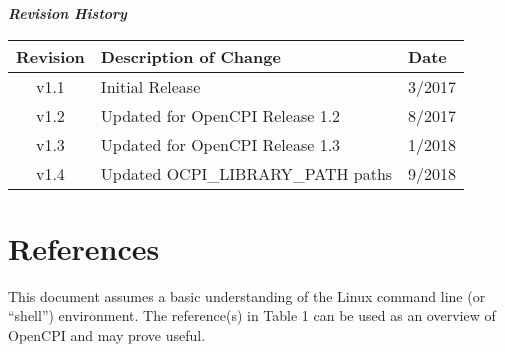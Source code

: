 	\begin{center}
	\textit{\textbf{Revision History}}
		\begin{table}[H]
		\label{table:revisions} %
			\begin{tabularx}{\textwidth}{|c|X|l|}
			\hline
			\rowcolor{blue}
			\textbf{Revision} & \textbf{Description of Change} & \textbf{Date} \\
		    \hline
		    v1.1 & Initial Release & 3/2017 \\
		    \hline
		    v1.2 & Updated for OpenCPI Release 1.2 & 8/2017 \\
			\hline
			v1.3 & Updated for OpenCPI Release 1.3 & 1/2018 \\
			\hline
			v1.4 & Updated OCPI\_LIBRARY\_PATH paths & 9/2018 \\
			\hline
			\end{tabularx}
		\end{table}
	\end{center}

\newpage

\tableofcontents

\newpage

\section{References}

	This document assumes a basic understanding of the Linux command line (or ``shell'') environment.  The reference(s) in Table 1 can be used as an overview of OpenCPI and may prove useful.

\def\myreferences{
\hline
FSK App\footnote{Provides details of the ``FSK App'' reference application} & OpenCPI & \path{FSK_app.pdf}\\
}


